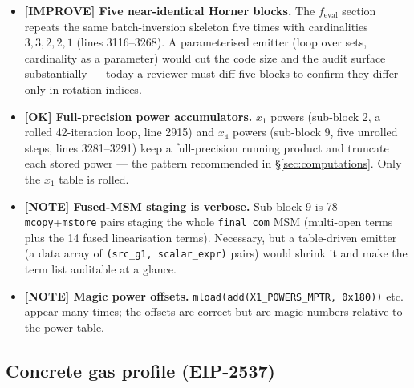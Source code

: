 \begin{itemize}
\begin{lstlisting}[style=yul]
// AFTER: 1 modexp
// stage the 5 full-products contiguously, one batch_invert,
// then each set's backward pass uses its own inverted product.
success := batch_invert(success, den_array, den_array_end, scratch, r)
\end{lstlisting}
        Saves $\sim$4 modexp calls per proof: $\approx$1{,}354 gas each
        under EIP-2565 ($\approx$5.4k; $\approx$6.8k if merged into the
        Lagrange batch), and 4{,}064 each under EIP-7883 (Osaka/Fusaka, live on mainnet and Sepolia)
        ($\approx$16.3k; $\approx$20.3k merged). 
  \item \textcolor{codegenblue}{\textbf{[IMPROVE] Five near-identical
        Horner blocks.}} The $f_\text{eval}$ section repeats the same
        batch-inversion skeleton five times with cardinalities
        $3,3,2,2,1$ (lines 3116--3268). A parameterised emitter (loop
        over sets, cardinality as a parameter) would cut the code size
        and the audit surface substantially --- today a reviewer must
        diff five blocks to confirm they differ only in rotation indices.
  \item \textcolor{tracegreen}{\textbf{[OK] Full-precision power
        accumulators.}} $x_1$ powers (sub-block 2, a rolled 42-iteration
        loop, line 2915) and $x_4$ powers (sub-block 9, five unrolled
        steps, lines 3281--3291) keep a full-precision running product and
        truncate each stored power --- the pattern recommended in
        \S\ref{sec:computations}. Only the $x_1$ table is rolled.
  \item \textcolor{mathpurple}{\textbf{[NOTE] Fused-MSM staging is
        verbose.}} Sub-block 9 is 78
        \texttt{mcopy}+\texttt{mstore} pairs staging the whole
        \texttt{final\_com} MSM (multi-open terms plus the 14 fused
        linearisation terms). Necessary, but a table-driven emitter (a
        data array of \texttt{(src\_\allowbreak{}g1, scalar\_\allowbreak{}expr)} pairs) would
        shrink it and make the term list auditable at a glance.
  \item \textcolor{mathpurple}{\textbf{[NOTE] Magic power offsets.}}
        \texttt{mload(add(X1\_\allowbreak{}POWERS\_\allowbreak{}MPTR, 0x180))} etc. appear many
        times; the offsets are correct but are magic numbers relative to
        the power table. 
\end{itemize}

\subsection{Concrete gas profile (EIP-2537)}
\label{sec:pr-gas-profile}

